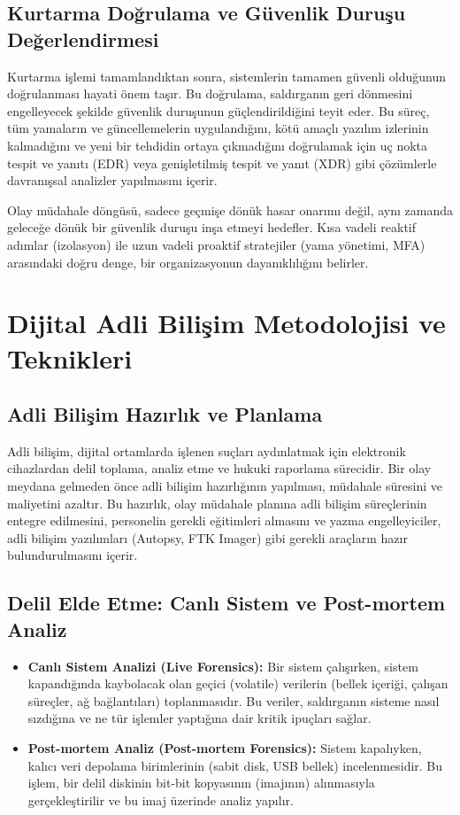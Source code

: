 \subsection{Kurtarma Doğrulama ve Güvenlik Duruşu Değerlendirmesi}

Kurtarma işlemi tamamlandıktan sonra, sistemlerin tamamen güvenli olduğunun doğrulanması hayati önem taşır. Bu doğrulama, saldırganın geri dönmesini engelleyecek şekilde güvenlik duruşunun güçlendirildiğini teyit eder. Bu süreç, tüm yamaların ve güncellemelerin uygulandığını, kötü amaçlı yazılım izlerinin kalmadığını ve yeni bir tehdidin ortaya çıkmadığını doğrulamak için uç nokta tespit ve yanıtı (EDR) veya genişletilmiş tespit ve yanıt (XDR) gibi çözümlerle davranışsal analizler yapılmasını içerir.

Olay müdahale döngüsü, sadece geçmişe dönük hasar onarımı değil, aynı zamanda geleceğe dönük bir güvenlik duruşu inşa etmeyi hedefler. Kısa vadeli reaktif adımlar (izolasyon) ile uzun vadeli proaktif stratejiler (yama yönetimi, MFA) arasındaki doğru denge, bir organizasyonun dayanıklılığını belirler.

\section{Dijital Adli Bilişim Metodolojisi ve Teknikleri}

\subsection{Adli Bilişim Hazırlık ve Planlama}

Adli bilişim, dijital ortamlarda işlenen suçları aydınlatmak için elektronik cihazlardan delil toplama, analiz etme ve hukuki raporlama sürecidir. Bir olay meydana gelmeden önce adli bilişim hazırlığının yapılması, müdahale süresini ve maliyetini azaltır. Bu hazırlık, olay müdahale planına adli bilişim süreçlerinin entegre edilmesini, personelin gerekli eğitimleri almasını ve yazma engelleyiciler, adli bilişim yazılımları (Autopsy, FTK Imager) gibi gerekli araçların hazır bulundurulmasını içerir.

\subsection{Delil Elde Etme: Canlı Sistem ve Post-mortem Analiz}

\begin{itemize}
    \item \textbf{Canlı Sistem Analizi (Live Forensics):} Bir sistem çalışırken, sistem kapandığında kaybolacak olan geçici (volatile) verilerin (bellek içeriği, çalışan süreçler, ağ bağlantıları) toplanmasıdır. Bu veriler, saldırganın sisteme nasıl sızdığına ve ne tür işlemler yaptığına dair kritik ipuçları sağlar.
    \item \textbf{Post-mortem Analiz (Post-mortem Forensics):} Sistem kapalıyken, kalıcı veri depolama birimlerinin (sabit disk, USB bellek) incelenmesidir. Bu işlem, bir delil diskinin bit-bit kopyasının (imajının) alınmasıyla gerçekleştirilir ve bu imaj üzerinde analiz yapılır.
\end{itemize}

